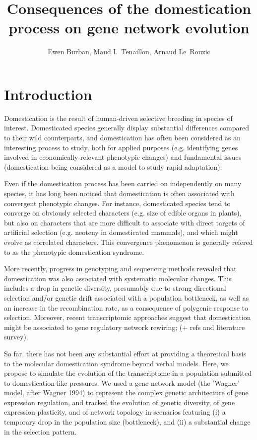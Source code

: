 \documentclass[12pt]{article}
\title{Consequences of the domestication process on gene network evolution}
\author{Ewen Burban, Maud I.\ Tenaillon, Arnaud Le~Rouzic}
\begin{document}
\maketitle

\section{Introduction}

Domestication is the result of human-driven selective breeding in species of interest. Domesticated species generally display substantial differences compared to their wild counterparts, and domestication has often been considered as an interesting process to study, both for applied purposes (e.g. identifying genes involved in economically-relevant phenotypic changes) and fundamental issues (domestication being considered as a model to study rapid adaptation).

Even if the domestication process has been carried on independently on many species, it has long been noticed that domestication is often associated with convergent phenotypic changes. For instance, domesticated species tend to converge on obviously selected characters (e.g. size of edible organs in plants), but also on characters that are more difficult to associate with direct targets of artificial selection (e.g. neoteny in domesticated mammals), and which might evolve as correlated characters. This convergence phenomenon is generally refered to as the phenotypic domestication syndrome. 

More recently, progress in genotyping and sequencing methods revealed that domestication was also associated with systematic molecular changes. This includes a drop in genetic diversity, presumably due to strong directional selection and/or genetic drift associated with a population bottleneck, as well as an increase in the recombination rate, as a consequence of polygenic response to selection. Moreover, recent transcriptomic approaches suggest that domestication might be associated to gene regulatory network rewiring; (+ refs and literature survey).

So far, there has not been any substantial effort at providing a theoretical basis to the molecular domestication syndrome beyond verbal models. Here, we propose to simulate the evolution of the transcriptome in a population submitted to domestication-like pressures. We used a gene network model (the 'Wagner' model, after Wagner 1994) to represent the complex genetic architecture of gene expression regulation, and tracked the evolution of genetic diversity, of gene expression plasticity, and of network topology in scenarios featuring (i) a temporary drop in the population size (bottleneck), and (ii) a substantial change in the selection pattern. 
\end{document}

